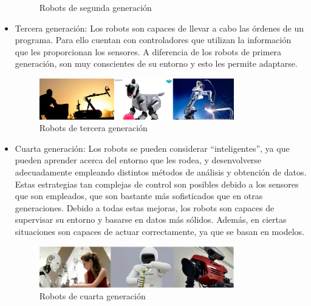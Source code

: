 \begin{itemize}
\begin{figure}[H]
\begin{center}
		\caption{Robots de segunda generación}
		\label{fig.segunda_generacion}
		\end{center}
\end{figure}
	\item Tercera generación: Los robots son capaces de llevar a cabo las órdenes de un programa. Para ello cuentan con controladores que utilizan la información que les proporcionan los sensores. A diferencia de los robots de primera generación, son muy conscientes de su entorno y esto les permite adaptarse.\\
	\begin{figure}[H]
  \begin{center}
    \includegraphics[width=0.8\textwidth]{figures/Introduccion/tercera_generacion.png}
		\caption{Robots de tercera generación}
		\label{fig.tercera_generacion}
		\end{center}
\end{figure}
	\item Cuarta generación: Los robots se pueden considerar ``inteligentes'', ya que pueden aprender acerca del entorno que les rodea, y desenvolverse adecuadamente empleando distintos métodos de análisis y obtención de datos. Estas estrategias tan complejas de control son posibles debido a los sensores que son empleados, que son bastante más sofisticados que en otras generaciones. Debido a todas estas mejoras, los robots son capaces de supervisar su entorno y basarse en datos más sólidos. Además, en ciertas situaciones son capaces de actuar correctamente, ya que se basan en modelos.\\
	 \begin{figure}[H]
  \begin{center}
    \includegraphics[width=0.8\textwidth]{figures/Introduccion/cuarta_generacion.png}
		\caption{Robots de cuarta generación}
		\label{fig.cuarta_generacion}
		\end{center}
\end{figure}
\end{itemize} 


